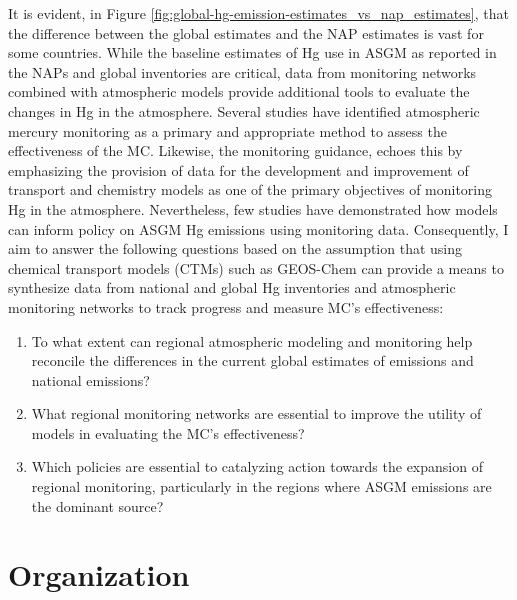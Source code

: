 \begin{flushleft}
 It is evident, in Figure \ref{fig:global-hg-emission-estimates_vs_nap_estimates}, that the difference between the global estimates and the NAP estimates is vast for some countries. While the baseline estimates of Hg use in ASGM as reported in the NAPs and global inventories are critical, data from monitoring networks combined with atmospheric models provide additional tools to evaluate the changes in Hg in the atmosphere. Several studies have identified atmospheric mercury monitoring as a primary and appropriate method to assess the effectiveness of the MC\cite{sprovieri_atmospheric_2016,evers_evaluating_2016,gustin_measuring_2015,united_nations_environment_programme_technical_2019}. Likewise, the monitoring guidance,\cite{unep_guidance_2021} echoes this by emphasizing the provision of data for the development and improvement of transport and chemistry models as one of the primary objectives of monitoring Hg in the atmosphere. Nevertheless, few studies have demonstrated how models can inform policy on ASGM Hg emissions using monitoring data. Consequently, I aim to answer the following questions based on the assumption that using chemical transport models (CTMs) such as GEOS-Chem can provide a means to synthesize data from national and global Hg inventories and atmospheric monitoring networks to track progress and measure MC's effectiveness:
\begin{enumerate}
  \item To what extent can regional atmospheric modeling and monitoring help reconcile the differences in the current global estimates of emissions and national emissions?
  \item What regional monitoring networks are essential to improve the utility of models in evaluating the MC's effectiveness?
  \item Which policies are essential to catalyzing action towards the expansion of regional monitoring, particularly in the regions where ASGM emissions are the dominant source?
\end{enumerate}
\end{flushleft}




 
\section{Organization}
 
